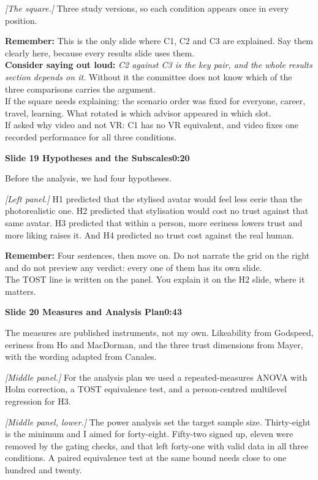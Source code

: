 \documentclass[11pt,a4paper]{article}
\newcommand{\slidehead}[3]{%
  \needspace{5\baselineskip}
  \vspace{0.9em}
  \noindent\colorbox{knblue}{\parbox{0.978\textwidth}{\vspace{1pt}\color{white}\textbf{Slide #1 \quad #2}\hfill\textbf{#3}\vspace{1pt}}}
  \vspace{0.35em}\par}
\newcommand{\remind}[1]{%
  \vspace{0.15em}
  \noindent\colorbox{knlight}{\parbox{0.972\textwidth}{\small\color{knblue}\textbf{Remember:} #1}}
  \vspace{0.2em}\par}
\newcommand{\pointto}[1]{{\color{knaccent}\textit{[#1]}}}
\begin{document}
\pointto{The square.} Three study versions, so each condition appears once in every position.

\remind{This is the only slide where C1, C2 and C3 are explained. Say them clearly here, because every results slide uses them.\\[0.4em] \textbf{Consider saying out loud:} \emph{C2 against C3 is the key pair, and the whole results section depends on it.} Without it the committee does not know which of the three comparisons carries the argument.\\[0.4em] If the square needs explaining: the scenario order was fixed for everyone, career, travel, learning. What rotated is which advisor appeared in which slot.\\[0.4em] If asked why video and not VR: C1 has no VR equivalent, and video fixes one recorded performance for all three conditions.}

\slidehead{19}{Hypotheses and the Subscales}{0:20}

Before the analysis, we had four hypotheses.

\pointto{Left panel.} H1 predicted that the stylised avatar would feel less eerie than the photorealistic one. H2 predicted that stylisation would cost no trust against that same avatar. H3 predicted that within a person, more eeriness lowers trust and more liking raises it. And H4 predicted no trust cost against the real human.

\remind{Four sentences, then move on. Do not narrate the grid on the right and do not preview any verdict: every one of them has its own slide.\\[0.4em] The TOST line is written on the panel. You explain it on the H2 slide, where it matters.}

\slidehead{20}{Measures and Analysis Plan}{0:43}

The measures are published instruments, not my own. Likeability from Godspeed, eeriness from Ho and MacDorman, and the three trust dimensions from Mayer, with the wording adapted from Canales.

\pointto{Middle panel.} For the analysis plan we used a repeated-measures ANOVA with Holm correction, a TOST equivalence test, and a person-centred multilevel regression for H3.

\pointto{Middle panel, lower.} The power analysis set the target sample size. Thirty-eight is the minimum and I aimed for forty-eight. Fifty-two signed up, eleven were removed by the gating checks, and that left forty-one with valid data in all three conditions. A paired equivalence test at the same bound needs close to one hundred and twenty.
\end{document}
